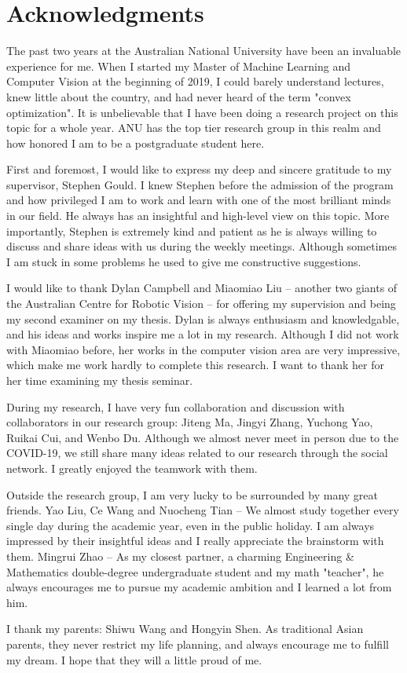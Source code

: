 \chapter*{Acknowledgments}
The past two years at the Australian National University have been an invaluable experience for me. When I started my Master of Machine Learning and Computer Vision at the beginning of 2019, I could barely understand lectures, knew little about the country, and had never heard of the term "convex optimization". It is unbelievable that I have been doing a research project on this topic for a whole year. ANU has the top tier research group in this realm and how honored I am to be a postgraduate student here. 
\par First and foremost, I would like to express my deep and sincere gratitude to my supervisor, Stephen Gould. I knew Stephen before the admission of the program and how privileged I am to work and learn with one of the most brilliant minds in our field. He always has an insightful and high-level view on this topic. More importantly, Stephen is extremely kind and patient as he is always willing to discuss and share ideas with us during the weekly meetings. Although sometimes I am stuck in some problems he used to give me constructive suggestions. 
\par I would like to thank Dylan Campbell and Miaomiao Liu -- another two giants of the Australian Centre for Robotic Vision -- for offering my supervision and being my second examiner on my thesis. Dylan is always enthusiasm and knowledgable, and his ideas and works inspire me a lot in my research. Although I did not work with Miaomiao before, her works in the computer vision area are very impressive, which make me work hardly to complete this research. I want to thank her for her time examining my thesis seminar. 
\par During my research, I have very fun collaboration and discussion with collaborators in our research group: Jiteng Ma, Jingyi Zhang, Yuchong Yao, Ruikai Cui, and Wenbo Du. Although we almost never meet in person due to the COVID-19, we still share many ideas related to our research through the social network. I greatly enjoyed the teamwork with them.
\par Outside the research group, I am very lucky to be surrounded by many great friends. Yao Liu, Ce Wang and Nuocheng Tian -- We almost study together every single day during the academic year, even in the public holiday. I am always impressed by their insightful ideas and I really appreciate the brainstorm with them. Mingrui Zhao -- As my closest partner, a charming Engineering \& Mathematics double-degree undergraduate student and my math "teacher", he always encourages me to pursue my academic ambition and I learned a lot from him. 
\par I thank my parents: Shiwu Wang and Hongyin Shen. As traditional Asian parents, they never restrict my life planning, and always encourage me to fulfill my dream. I hope that they will a little proud of me. 